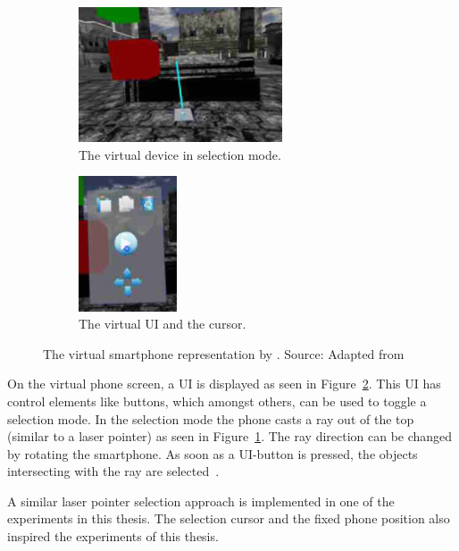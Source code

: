 \begin{figure}[H]
	\centering
	\begin{subfigure}[t]{0.45\textwidth}%
		\centering%
		\includegraphics[height=4cm]{figures/related_work/steed_2013_laser_pointer.png}
		\caption{The virtual device in selection mode.}\label{fig:steed-2013-laser-pointer}%
	\end{subfigure}%
	\hspace{0.1\textwidth}%
	\begin{subfigure}[t]{0.45\textwidth}%
		\centering%
		\includegraphics[height=4cm]{figures/related_work/steed_2013_ui.png}
		\caption{The virtual \gls{UI} and the cursor.}\label{fig:steed-2013-ui}
	\end{subfigure}%
  \caption[Virtual smartphone representation by Steep et al.]{The virtual smartphone representation by \citeauthor{Steed.2013}.
  \newline{}
  Source: Adapted from~\protect\cite[Figure 1]{Steed.2013}
  }\label{fig:steed-2013}
\end{figure}

On the virtual phone screen, a \gls{UI} is displayed as seen in Figure~\ref{fig:steed-2013-ui}. This \gls{UI} has control elements like buttons, which amongst others, can be used to toggle a selection mode. In the selection mode the phone casts a ray out of the top (similar to a laser pointer) as seen in Figure~\ref{fig:steed-2013-laser-pointer}. The ray direction can be changed by rotating the smartphone. As soon as a \gls{UI}-button is pressed, the objects intersecting with the ray are selected~\cite{Steed.2013}.

A similar laser pointer selection approach is implemented in one of the experiments in this thesis. The selection cursor and the fixed phone position also inspired the experiments of this thesis.


